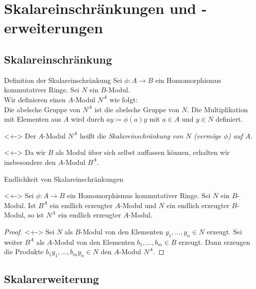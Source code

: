 \section{Skalareinschränkungen und -erweiterungen}

\subsection{Skalareinschränkung}

\begin{frame}{Definition der Skalareinschränkung}
	Sei \(\phi\colon A \to B\) ein Homomorphismus kommutativer Ringe. Sei \(N\) ein \(B\)-Modul.
	\\
	Wir definieren einen \(A\)-Modul \(N^A\) wie folgt:
	\\
	Die abelsche Gruppe von \(N^A\) ist die abelsche Gruppe von \(N\). Die Multiplikation mit
	Elementen aus \(A\) wird durch \(a y \coloneqq \phi(a) y\) mit \(a \in A\) und \(y \in N\)
	definiert.
	\begin{definition}<+->
		Der \(A\)-Modul \(N^A\) heißt die \emph{Skalareinschränkung von \(N\) (vermöge \(\phi\)) auf \(A\)}.
	\end{definition}
	\begin{example}<+->
		Da wir \(B\) als Modul über sich selbst auffassen können, erhalten wir insbesondere den
		\(A\)-Modul \(B^A\).
	\end{example}
\end{frame}

\begin{frame}{Endlichkeit von Skalareinschränkungen}
	\begin{proposition}<+->
		Sei \(\phi\colon A \to B\) ein Homomorphismus kommutativer Ringe. Sei \(N\) ein \(B\)-Modul.
		Ist \(B^A\) ein endlich erzeugter \(A\)-Modul und \(N\) ein endlich erzeugter \(B\)-Modul,
		so ist \(N^A\) ein endlich erzeugter \(A\)-Modul.
	\end{proposition}
	\begin{proof}<+->
		Sei \(N\) als \(B\)-Modul von den Elementen \(y_1, \dotsc, y_n \in N\) erzeugt. Sei weiter
		\(B^A\) als \(A\)-Modul von den Elementen \(b_1, \dotsc, b_m \in B\) erzeugt. Dann erzeugen die
		Produkte \(b_1 y_1, \dotsc, b_m y_n \in N\) den \(A\)-Modul \(N^A\).
	\end{proof}
\end{frame}

\subsection{Skalarerweiterung}


